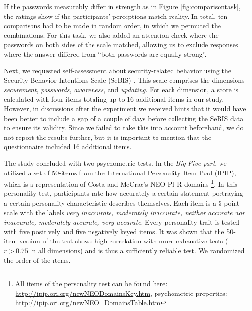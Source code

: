 If the passwords measurably differ in strength as in Figure \ref{fig:comparisontask}, the ratings show if the participants' perceptions match reality. In total, ten comparisons had to be made in random order, in which we permuted the combinations. For this task, we also added an attention check where the passwords on both sides of the scale matched, allowing us to exclude responses where the answer differed from ``both passwords are equally strong''. 

Next, we requested self-assessment about security-related behavior using the Security Behavior Intentions Scale (SeBIS) \cite{Egelman2015SeBIS}. This scale comprises the dimensions \textit{securement}, \textit{passwords}, \textit{awareness}, and \textit{updating}. For each dimension, a score is calculated with four items totaling up to 16 additional items in our study. However, in discussions after the experiment we received hints that it would have been better to include a gap of a couple of days before collecting the SeBIS data to ensure its validity. Since we failed to take this into account beforehand, we do not report the results further, but it is important to mention that the questionnaire included 16 additional items. 

The study concluded with two psychometric tests. In the \textit{Big-Five part}, we utilized a set of 50-items from the International Personality Item Pool (IPIP), which is a representation of Costa and McCrae's NEO-PI-R domains \citep{Costa1992NEO}\footnote{All items of the personality test can be found here: \url{http://ipip.ori.org/newNEODomainsKey.htm}, psychometric properties: \url{http://ipip.ori.org/newNEO_DomainsTable.htm}}. In this personality test, participants rate how accurately a certain statement portraying a certain personality characteristic describes themselves. Each item is a 5-point scale with the labels \textit{very inaccurate, moderately inaccurate, neither accurate nor inaccurate, moderately accurate, very accurate}. Every personality trait is tested with five positively and five negatively keyed items. It was shown that the 50-item version of the test shows high correlation with more exhaustive tests ($r > 0.75$ in all dimensions) and is thus a sufficiently reliable test. We randomized the order of the items.

